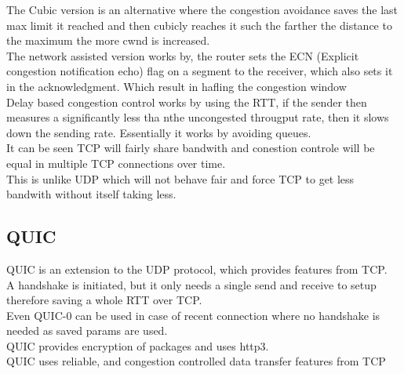 \documentclass[12pt, a4paper]{article}
\begin{document}
				The Cubic version is an alternative where the congestion avoidance saves the last max limit it reached and then cubicly reaches it such the farther the distance to the maximum the more cwnd is increased.\\[4mm]
				The network assisted version works by, the router sets the ECN (Explicit congestion notification echo) flag on a segment to the receiver, which also sets it in the acknowledgment. Which result in hafling the congestion window\\
				Delay based congestion control works by using the RTT, if the sender then measures a significantly less tha nthe uncongested througput rate, then it slows down the sending rate. Essentially it works by avoiding queues.\\[4mm]
				It can be seen TCP will fairly share bandwith and conestion controle will be equal in multiple TCP connections over time.\\
				This is unlike UDP which will not behave fair and force TCP to get less bandwith without itself taking less.
		\subsection{QUIC}
			QUIC is an extension to the UDP protocol, which provides features from TCP.\\
			A handshake is initiated, but it only needs a single send and receive to setup therefore saving a whole RTT over TCP.\\
			Even QUIC-0 can be used in case of recent connection where no handshake is needed as saved params are used.\\
			QUIC provides encryption of packages and uses http3.\\
			QUIC uses reliable, and congestion controlled data transfer features from TCP
\end{document}
